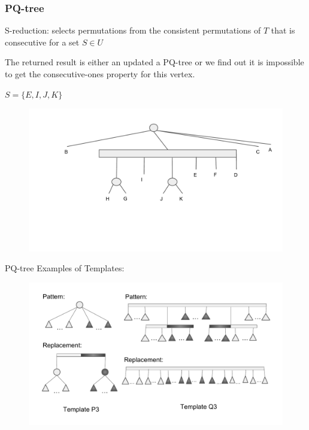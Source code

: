 \documentclass{beamer}
\begin{document}
\begin{frame}
	\frametitle{PQ-tree}
	\vspace{0.2in}
    S-reduction: selects permutations from the consistent permutations of $T$ that is consecutive for a set $S \in U$
    
    \vspace{0.1in}
    
    The returned result is either an updated a PQ-tree or we find out it is impossible to get the consecutive-ones property for this vertex.
    
    \vspace{0.1in}
    
    $S = \{ E,I,J,K\}$
    
	\begin{figure}
		\includegraphics[width = 1\textwidth]{figures/pqtree_3.pdf}
	\end{figure}
	
\end{frame}

\begin{frame}{PQ-tree}
    Examples of Templates:
    \begin{figure}
		\includegraphics[width = 1\textwidth]{figures/pqtree_p3q3.pdf}
	\end{figure}
\end{frame}
\end{document}
